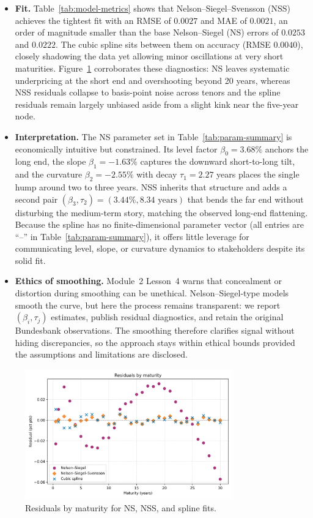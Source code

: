\documentclass[12pt]{article}
\begin{document}
\begin{spacing}{1.15}
\begin{itemize}[leftmargin=1.3em]
  \item \textbf{Fit.} Table~\ref{tab:model-metrics} shows that Nelson--Siegel--Svensson (NSS) achieves the tightest fit with an RMSE of $0.0027$ and MAE of $0.0021$, an order of magnitude smaller than the base Nelson--Siegel (NS) errors of $0.0253$ and $0.0222$. The cubic spline sits between them on accuracy (RMSE $0.0040$), closely shadowing the data yet allowing minor oscillations at very short maturities. Figure~\ref{fig:residuals} corroborates these diagnostics: NS leaves systematic underpricing at the short end and overshooting beyond 20 years, whereas NSS residuals collapse to basis-point noise across tenors and the spline residuals remain largely unbiased aside from a slight kink near the five-year node.
  \item \textbf{Interpretation.} The NS parameter set in Table~\ref{tab:param-summary} is economically intuitive but constrained. Its level factor $\beta_0=3.68\%$ anchors the long end, the slope $\beta_1=-1.63\%$ captures the downward short-to-long tilt, and the curvature $\beta_2=-2.55\%$ with decay $\tau_1=2.27$ years places the single hump around two to three years. NSS inherits that structure and adds a second pair $(\beta_3,\tau_2)=(3.44\%,8.34\text{ years})$ that bends the far end without disturbing the medium-term story, matching the observed long-end flattening. Because the spline has no finite-dimensional parameter vector (all entries are ``--'' in Table~\ref{tab:param-summary}), it offers little leverage for communicating level, slope, or curvature dynamics to stakeholders despite its solid fit.
  \item \textbf{Ethics of smoothing.} Module~2 Lesson~4 warns that concealment or distortion during smoothing can be unethical. Nelson--Siegel-type models smooth the curve, but here the process remains transparent: we report $(\beta_i,\tau_j)$ estimates, publish residual diagnostics, and retain the original Bundesbank observations. The smoothing therefore clarifies signal without hiding discrepancies, so the approach stays within ethical bounds provided the assumptions and limitations are disclosed.
\end{itemize}
\end{spacing}



\begin{figure}[htbp]
  \centering
  \includegraphics[width=0.8\textwidth]{../data/output/figure_model_residuals.png}
  \caption{Residuals by maturity for NS, NSS, and spline fits.}
  \label{fig:residuals}
\end{figure}

\printbibliography
\end{document}
